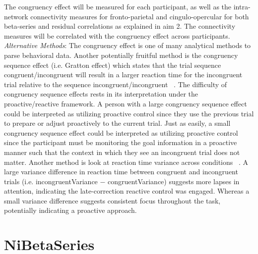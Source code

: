 \documentclass[phd,appendix,figures]{uithesis}
\begin{document}
The congruency effect will be measured for each participant, as well as the intra-network connectivity measures for fronto-parietal and cingulo-opercular for both beta-series and residual correlations as explained in aim 2.
The connectivity measures will be correlated with the congruency effect across participants.
\newline
\textit{Alternative Methods}: The congruency effect is one of many analytical methods to parse behavioral data.
Another potentially fruitful method is the congruency sequence effect (i.e. Gratton effect) which states that the trial sequence congruent/incongruent will result in a larger reaction time for the incongruent trial relative to the sequence incongruent/incongruent ~\citep{Gehring1992,Egner2007}.
The difficulty of congruency sequence effects rests in its interpretation under the proactive/reactive framework.
A person with a large congruency sequence effect could be interpreted as utilizing proactive control since they use the previous trial to prepare or adjust proactively to the current trial.
Just as easily, a small congruency sequence effect could be interpreted as utilizing proactive control since the participant must be monitoring the goal information in a proactive manner such that the context in which they see an incongruent trial does not matter.
Another method is look at reaction time variance across conditions ~\citep{Fassbender2014}. 
A large variance difference in reaction time between congruent and incongruent trials (i.e. incongruentVariance $-$ congruentVariance) suggests more lapses in attention, indicating the late-correction reactive control was engaged.
Whereas a small variance difference suggests consistent focus throughout the task, potentially indicating a proactive approach.


\chapter{NiBetaSeries}
\end{document}
